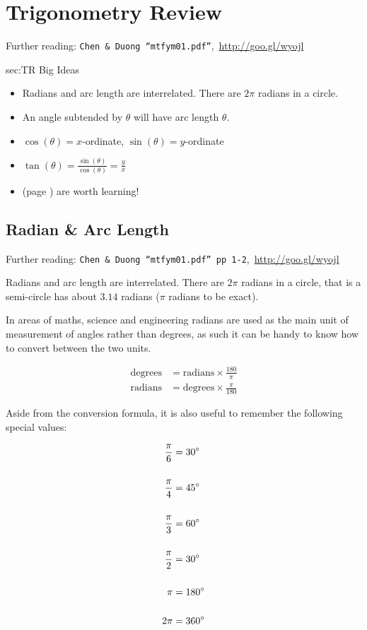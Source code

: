 \chapter{Trigonometry Review}
\label{chap:TR}
Further reading: \texttt{Chen \& Duong ``mtfym01.pdf''},\, \url{http://goo.gl/wyojl}

\begin{bigideas}{sec:TR Big Ideas}
\begin{itemize}
  \item Radians and arc length are interrelated. There are $2\pi$ radians
  in a circle.
  \item An angle subtended by $\theta$ will have arc length $\theta$.
  \item $\cos(\theta) = x$-ordinate, $\sin(\theta) = y$-ordinate
  \item $\tan(\theta) = \frac{\sin(\theta)}{\cos(\theta)} = \frac{y}{x}$
  \item {} (page \pageref{sec:TR
  Pythagorean Identities}) are worth learning!
\end{itemize}
\end{bigideas}

\section{Radian \& Arc Length}
\label{sec:TR Radian and Arc Length}
Further reading: \texttt{Chen \& Duong ``mtfym01.pdf'' pp 1-2},\, \url{http://goo.gl/wyojl}

Radians and arc length are interrelated. There are $2\pi$ radians in a circle,
that is a semi-circle has about $3.14$ radians ($\pi$ radians to be exact).

In areas of maths, science and engineering radians are used as the main unit of
measurement of angles rather than degrees, as such it can be handy to know how
to convert between the two units.

\begin{align}
  \text{degrees} & = \text{radians} \times \frac{180}{\pi} \\[0.5cm]
  \text{radians} & = \text{degrees} \times \frac{\pi}{180}
\end{align}

Aside from the conversion formula, it is also useful to remember the following
special values:

\begin{align}
  \frac{\pi}{6} & = 30^\circ \\[0.5cm]
  \frac{\pi}{4} & = 45^\circ \\[0.5cm]
  \frac{\pi}{3} & = 60^\circ \\[0.5cm]
  \frac{\pi}{2} & = 30^\circ \\[0.5cm]
  \pi           & = 180^\circ \\[0.5cm]
  2\pi &= 360^\circ
\end{align}

